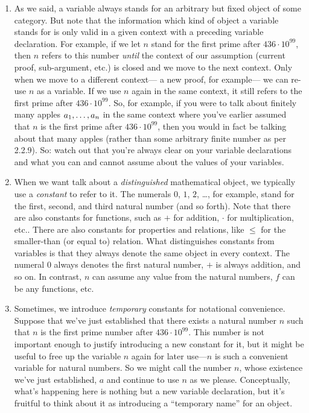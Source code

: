 \begin{enumerate}[{\thesection}.1]
  \item As we said, a variable always stands for an arbitrary but fixed object of some category.
	But note that the information which kind of object a variable stands for is only valid in a given context with a preceding variable declaration.
	For example, if we let $n$ stand for the first prime after  $436\cdot 10^{99}$,
	then $n$ refers to this number \emph{until} the context of our assumption (current proof, sub-argument, etc.) is closed and we move to the next context.
	Only when we move to a different context---
	a new proof, for example---
	we can re-use $n$ as a variable.
	If we use $n$ again in the same context, it still refers to the first prime after
	$436\cdot 10^{99}$.
	So, for example, if you were to talk about finitely many apples $a_{1}, \mathellipsis, a_{n}$ in the same context where you've earlier assumed that $n$ is the first prime after
	$436\cdot 10^{99}$,
	then you would in fact be talking about that many apples (rather than some arbitrary finite number as per 2.2.9).
	So: watch out that you're always clear on your variable declarations and what you can and cannot assume about the values of your variables.
		
		\item When we want talk about a \emph{distinguished} mathematical object, we typically use a \emph{constant} to refer to it. The numerals $0$, $1$, $2$, \dots, for example, stand for the first, second, and third natural number (and so forth). Note that there are also constants for functions, such as $+$ for addition, $\cdot$ for multiplication, etc.. There are also constants for properties and relations, like $\leq$ for the smaller-than (or equal to) relation. What distinguishes constants from variables is that they always denote the same object in every context. The numeral $0$ always denotes the first natural number, $+$ is always addition, and so on. In contrast, $n$ can assume any value from the natural numbers, $f$ can be any functions, etc. 
		
		\item Sometimes, we introduce \emph{temporary} constants for notational convenience. Suppose that we've just established that there exists a natural number $n$ such that $n$ is the first prime number after $436\cdot 10^{99}$. This number is not important enough to justify introducing a new constant for it, but it might be useful to free up the variable $n$ again for later use---$n$ is such a convenient variable for natural numbers. So we might call the number $n$, whose existence we've just established, $a$ and continue to use $n$ as we please. Conceptually, what's happening here is nothing but a new variable declaration, but it's fruitful to think about it as introducing a ``temporary name'' for an object. 
		

\end{enumerate}
